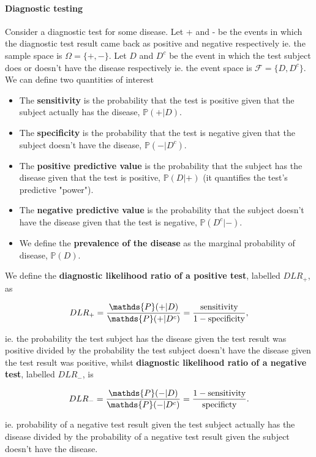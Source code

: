 \documentclass{homework}
\begin{document}
\paragraph{Diagnostic testing}

Consider a diagnostic test for some disease. Let + and - be the events in which the diagnostic test result came back as positive and negative respectively ie. the sample space is $\Omega=\{+,-\}$. Let $D$ and $D^c$ be the event in which the test subject does or doesn't have the disease respectively ie. the event space is $\mathcal{F} =\{D, D^c\}$. We can define two quantities of interest 

\begin{itemize}
\item The \textbf{sensitivity} is the probability that the test is positive given that the subject actually has the disease, $\mathds{P}(+|D)$.
\item The \textbf{specificity} is the probability that the test is negative given that the subject doesn't have the disease, $\mathds{P}(-|D^c)$. 
\item The \textbf{positive predictive value} is the probability that the subject has the disease given that the test is positive, $\mathds{P}(D|+)$ (it quantifies the test's predictive "power").
\item The \textbf{negative predictive value} is the probability that the subject doesn't have the disease given that the test is negative, $\mathds{P}(D^c|-)$.
\item We define the \textbf{prevalence of the disease} as the marginal probability of disease, $\mathds{P}(D)$.
\end{itemize}

We define the \textbf{diagnostic likelihood ratio of a positive test}, labelled $DLR_+$, as 

$$
DLR_+ = \frac{\mathds{P}(+|D)}{\mathds{P}(+|D^c)} = \frac{\textnormal{sensitivity}}{1-\textnormal{specificity}},
$$

ie. the probability the test subject has the disease given the test result was positive divided by the probability the test subject doesn't have the disease given the test result was positive, whilst \textbf{diagnostic likelihood ratio of a negative test}, labelled $DLR_-$, is 

$$
DLR_- = \frac{\mathds{P}(-|D)}{\mathds{P}(-|D^c)} = \frac{1-\textnormal{sensitivity}}{\textnormal{specificty}}.
$$

ie. probability of a negative test result given the test subject actually has the disease divided by the probability of a negative test result given the subject doesn't have the disease. \\
\end{document}
